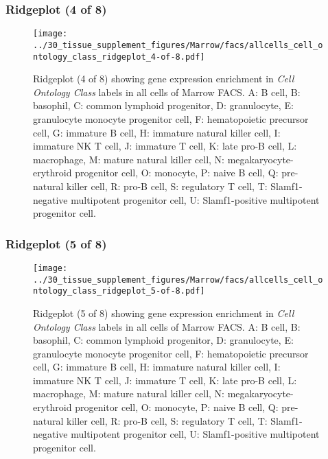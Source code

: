 \subsubsection{Ridgeplot (4 of 8)}
\begin{figure}[h]
\centering
\texttt{[image: ../30\_tissue\_supplement\_figures/Marrow/facs/allcells\_cell\_ontology\_class\_ridgeplot\_4-of-8.pdf]}

\caption{ Ridgeplot (4 of 8)  showing gene expression enrichment in \emph{Cell Ontology Class} labels in all cells of Marrow FACS. A: B cell, B: basophil, C: common lymphoid progenitor, D: granulocyte, E: granulocyte monocyte progenitor cell, F: hematopoietic precursor cell, G: immature B cell, H: immature natural killer cell, I: immature NK T cell, J: immature T cell, K: late pro-B cell, L: macrophage, M: mature natural killer cell, N: megakaryocyte-erythroid progenitor cell, O: monocyte, P: naive B cell, Q: pre-natural killer cell, R: pro-B cell, S: regulatory T cell, T: Slamf1-negative multipotent progenitor cell, U: Slamf1-positive multipotent progenitor cell.}
\end{figure}


\clearpage

\subsubsection{Ridgeplot (5 of 8)}
\begin{figure}[h]
\centering
\texttt{[image: ../30\_tissue\_supplement\_figures/Marrow/facs/allcells\_cell\_ontology\_class\_ridgeplot\_5-of-8.pdf]}

\caption{ Ridgeplot (5 of 8)  showing gene expression enrichment in \emph{Cell Ontology Class} labels in all cells of Marrow FACS. A: B cell, B: basophil, C: common lymphoid progenitor, D: granulocyte, E: granulocyte monocyte progenitor cell, F: hematopoietic precursor cell, G: immature B cell, H: immature natural killer cell, I: immature NK T cell, J: immature T cell, K: late pro-B cell, L: macrophage, M: mature natural killer cell, N: megakaryocyte-erythroid progenitor cell, O: monocyte, P: naive B cell, Q: pre-natural killer cell, R: pro-B cell, S: regulatory T cell, T: Slamf1-negative multipotent progenitor cell, U: Slamf1-positive multipotent progenitor cell.}
\end{figure}


\clearpage

